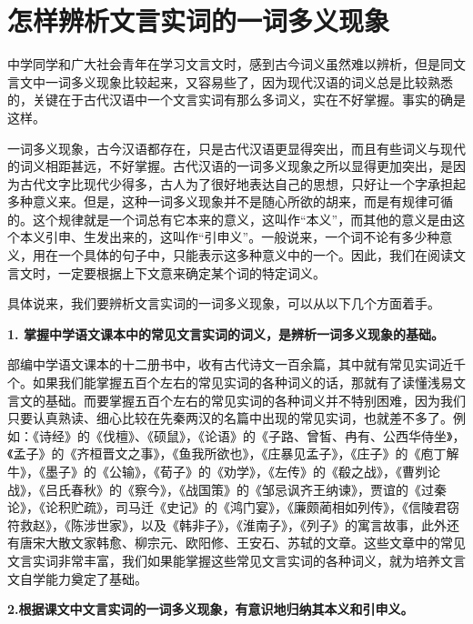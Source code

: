 \section{怎样辨析文言实词的一词多义现象}

中学同学和广大社会青年在学习文言文时，感到古今词义虽然难以辨析，但是同文言文中一词多义现象比较起来，又容易些了，因为现代汉语的词义总是比较熟悉的，关键在于古代汉语中一个文言实词有那么多词义，实在不好掌握。事实的确是这样。

一词多义现象，古今汉语都存在，只是古代汉语更显得突出，而且有些词义与现代的词义相距甚远，不好掌握。古代汉语的一词多义现象之所以显得更加突出，是因为古代文字比现代少得多，古人为了很好地表达自己的思想，只好让一个字承担起多种意义来。但是，这种一词多义现象并不是随心所欲的胡来，而是有规律可循的。这个规律就是一个词总有它本来的意义，这叫作“本义”，而其他的意义是由这个本义引申、生发出来的，这叫作“引申义”。一般说来，一个词不论有多少种意义，用在一个具体的句子中，只能表示这多种意义中的一个。因此，我们在阅读文言文时，一定要根据上下文意来确定某个词的特定词义。

具体说来，我们要辨析文言实词的一词多义现象，可以从以下几个方面着手。

\textbf{1. 掌握中学语文课本中的常见文言实词的词义，是辨析一词多义现象的基础。}

部编中学语文课本的十二册书中，收有古代诗文一百余篇，其中就有常见实词近千个。如果我们能掌握五百个左右的常见实词的各种词义的话，那就有了读懂浅易文言文的基础。而要掌握五百个左右的常见实词的各种词义并不特别困难，因为我们只要认真熟读、细心比较在先秦两汉的名篇中出现的常见实词，也就差不多了。例如：《诗经》的《伐檀》、《硕鼠》，《论语》的《子路、曾皙、冉有、公西华侍坐》，《孟子》的《齐桓晋文之事》，《鱼我所欲也》，《庄暴见孟子》，《庄子》的《庖丁解牛》，《墨子》的《公输》，《荀子》的《劝学》，《左传》的《殽之战》，《曹刿论战》，《吕氏春秋》的《察今》，《战国策》的《邹忌讽齐王纳谏》，贾谊的《过秦论》，《论积贮疏》，司马迁《史记》的《鸿门宴》，《廉颇蔺相如列传》，《信陵君窃符救赵》，《陈涉世家》，以及《韩非子》，《淮南子》，《列子》的寓言故事，此外还有唐宋大散文家韩愈、柳宗元、欧阳修、王安石、苏轼的文章。这些文章中的常见文言实词非常丰富，我们如果能掌握这些常见文言实词的各种词义，就为培养文言文自学能力奠定了基础。

\textbf{2.根据课文中文言实词的一词多义现象，有意识地归纳其本义和引申义。}

